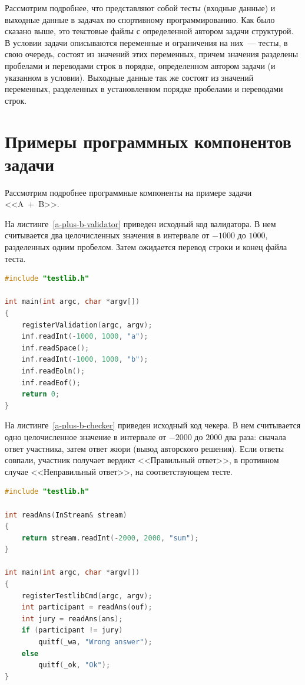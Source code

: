 \documentclass[times,specification,annotation]{style/itmo-student-thesis/itmo-student-thesis}
\begin{document}
Рассмотрим подробнее, что представляют собой тесты (входные данные) и выходные данные в задачах по спортивному программированию. Как было сказано выше, это текстовые файлы с определенной автором задачи структурой. В условии задачи описываются переменные и ограничения на них~--- тесты, в свою очередь, состоят из значений этих переменных, причем значения разделены пробелами и переводами строк в порядке, определенном автором задачи (и указанном в условии). Выходные данные так же состоят из значений переменных, разделенных в установленном порядке пробелами и переводами строк.

\section{Примеры программных компонентов задачи}

Рассмотрим подробнее программные компоненты на примере задачи <<A~+~B>>.

На листинге~\ref{a-plus-b-validator} приведен исходный код валидатора. В нем считывается два целочисленных значения в интервале от $-1000$ до $1000$, разделенных одним пробелом. Затем ожидается перевод строки и конец файла теста.

\begin{lstlisting}[float=!h,caption={Пример валидатора},label={a-plus-b-validator},language=c++]
#include "testlib.h"

int main(int argc, char *argv[])
{
    registerValidation(argc, argv);
    inf.readInt(-1000, 1000, "a");
    inf.readSpace();
    inf.readInt(-1000, 1000, "b");
    inf.readEoln();
    inf.readEof();
    return 0;
}
\end{lstlisting}

На листинге~\ref{a-plus-b-checker} приведен исходный код чекера. В нем считывается одно целочисленное значение в интервале от $-2000$ до $2000$ два раза: сначала ответ участника, затем ответ жюри (вывод авторского решения). Если ответы совпали, участник получает вердикт <<Правильный ответ>>, в противном случае <<Неправильный ответ>>, на соответствующем тесте.

\begin{lstlisting}[float=!h,caption={Пример чекера},label={a-plus-b-checker},language=c++]
#include "testlib.h"

int readAns(InStream& stream)
{
    return stream.readInt(-2000, 2000, "sum");
}

int main(int argc, char *argv[])
{
    registerTestlibCmd(argc, argv);
    int participant = readAns(ouf);
    int jury = readAns(ans);
    if (participant != jury)
        quitf(_wa, "Wrong answer");
    else
        quitf(_ok, "Ok");
}
\end{lstlisting}
\end{document}
